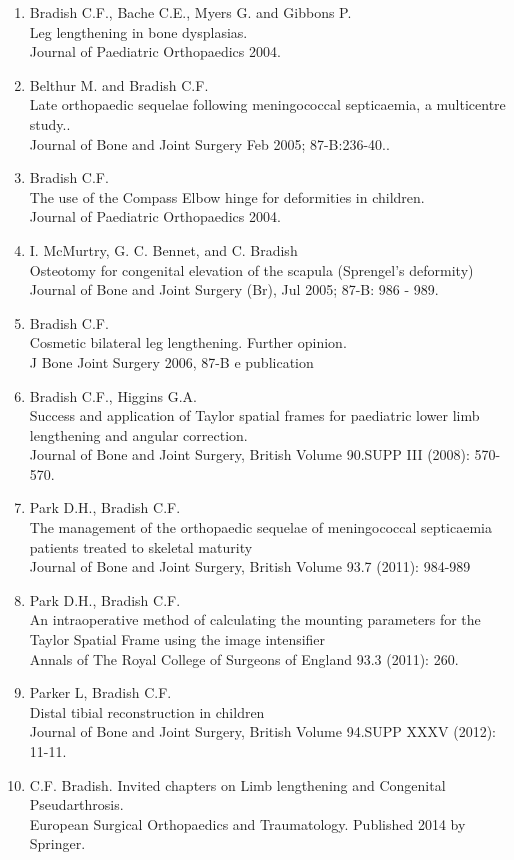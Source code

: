 \documentclass[margin,line]{res}
\begin{document}
\begin{resume}
\begin{enumerate}
\item Bradish C.F., Bache C.E., Myers G. and Gibbons P.\\
Leg lengthening in bone dysplasias.\\
    Journal of Paediatric Orthopaedics 2004.
\item Belthur M. and Bradish C.F.\\
Late orthopaedic sequelae  following  meningococcal  septicaemia, a multicentre study..\\
Journal of Bone and Joint Surgery  Feb 2005; 87-B:236-40..
\item Bradish C.F.\\
The use of the Compass Elbow hinge for deformities in children.\\
Journal of Paediatric Orthopaedics 2004.
\item I. McMurtry, G. C. Bennet, and C. Bradish\\
      Osteotomy for congenital elevation of the scapula (Sprengel's deformity)\\
   Journal of Bone and Joint Surgery (Br), Jul 2005; 87-B: 986 - 989. 
\item Bradish C.F.\\
      Cosmetic bilateral leg lengthening. Further opinion.\\
   J Bone Joint Surgery 2006, 87-B e publication
 \item Bradish C.F., Higgins G.A.\\
Success and  application  of Taylor spatial frames  for  paediatric lower  limb lengthening and angular correction.\\
Journal of Bone and Joint Surgery, British Volume 90.SUPP III (2008): 570-570.
\item Park D.H., Bradish C.F.\\
The management  of the orthopaedic sequelae of meningococcal septicaemia patients treated to skeletal maturity\\
Journal of Bone and Joint Surgery, British Volume 93.7 (2011): 984-989
\item Park D.H., Bradish C.F.\\
An intraoperative method of calculating the mounting parameters for the Taylor Spatial Frame using the image intensifier\\
Annals of The Royal College of Surgeons of England 93.3 (2011): 260.
\item Parker L, Bradish C.F.\\
Distal tibial reconstruction in children\\
Journal of Bone and Joint Surgery, British Volume 94.SUPP XXXV (2012): 11-11.
\item C.F. Bradish. Invited chapters on Limb lengthening and Congenital Pseudarthrosis.\\
European Surgical Orthopaedics and Traumatology. Published 2014 by Springer. 
\end{enumerate}

\end{resume}
\end{document}

